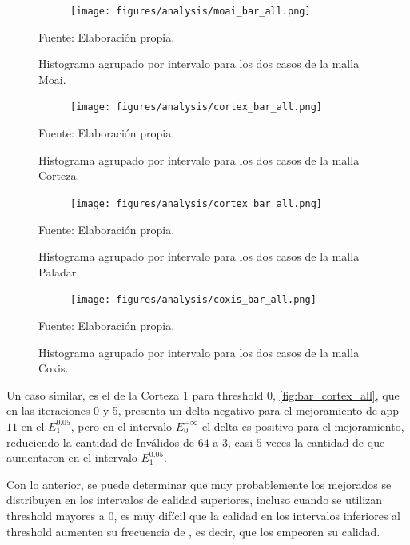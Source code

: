 \begin{figure}[!ht]
	\centering
	\begin{subfigure}[t]{1.0\textwidth}
		\texttt{[image: figures/analysis/moai\_bar\_all.png]}
	\end{subfigure}
	\caption{ Histograma agrupado por intervalo para los dos casos de la malla Moai. }
	Fuente: Elaboración propia.
	\label{fig:bar_moai_all}
\end{figure}

\begin{figure}[!ht]
	\centering
	\begin{subfigure}[t]{1.0\textwidth}
		\texttt{[image: figures/analysis/cortex\_bar\_all.png]}
	\end{subfigure}
	\caption{ Histograma agrupado por intervalo para los dos casos de la malla Corteza.  }
	Fuente: Elaboración propia.
	\label{fig:bar_cortex_all}
\end{figure}


\begin{figure}[!ht]
	\centering
	\begin{subfigure}[t]{1.0\textwidth}
		\texttt{[image: figures/analysis/cortex\_bar\_all.png]}
	\end{subfigure}
	\caption{ Histograma agrupado por intervalo para los dos casos de la malla Paladar.  }
	Fuente: Elaboración propia.
	\label{fig:bar_palate_all}
\end{figure}

\begin{figure}[!ht]
\centering
\begin{subfigure}[t]{1.0\textwidth}
	\texttt{[image: figures/analysis/coxis\_bar\_all.png]}
\end{subfigure}
\caption{ Histograma agrupado por intervalo para los dos casos de la malla Coxis.  }
Fuente: Elaboración propia.
\label{fig:bar_coxis_all}
\end{figure}

Un caso similar, es el de la Corteza 1 para threshold $0$, \autoref{fig:bar_cortex_all}, que en las iteraciones 0 y 5, presenta un delta negativo para el mejoramiento de app $11$ \elements{} en el $E^{0.05}_{1}$, pero en el intervalo  $E^{-\infty}_{0}$ el delta es positivo para el mejoramiento, reduciendo la cantidad de \elements{} Inválidos de $64$ a $3$, casi $5$ veces la cantidad de \elements{} que aumentaron en el intervalo  $E^{0.05}_{1}$. 

Con lo anterior, se puede determinar que muy probablemente los \elements{} mejorados se distribuyen en los intervalos de calidad superiores, incluso cuando se utilizan threshold mayores a $0$, es muy difícil que la calidad en los intervalos inferiores al threshold aumenten su frecuencia de \elements{}, es decir, que los \elements{} empeoren su calidad.


